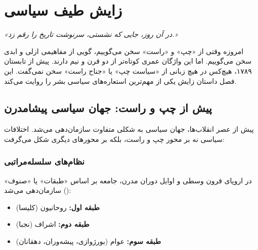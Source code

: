 
\chapter{زایش طیف سیاسی}
\label{ch:birth-of-spectrum}

\begin{flushright}
\textit{«در آن روز، جایی که نشستی، سرنوشت تاریخ را رقم زد.»}
\end{flushright}


\lettrine[lines=3, lraise=0.1, nindent=0.5em]{\textcolor{LeftRed}{ا}}{مروزه} 
وقتی از «چپ» و «راست» سخن می‌گوییم، گویی از مفاهیمی ازلی و ابدی سخن می‌گوییم. اما این واژگان عمری کوتاه‌تر از دو قرن و نیم دارند. پیش از تابستان ۱۷۸۹، هیچ‌کس در هیچ زبانی از «سیاست چپ» یا «جناح راست» سخن نمی‌گفت. این فصل داستان زایش یکی از مهم‌ترین استعاره‌های سیاسی بشر را روایت می‌کند.

\section{پیش از چپ و راست: جهان سیاسی پیشامدرن}

پیش از عصر انقلاب‌ها، جهان سیاسی به شکلی متفاوت سازمان‌دهی می‌شد. اختلافات سیاسی نه بر محور چپ و راست، بلکه بر محورهای دیگری شکل می‌گرفت:

\subsection{نظام‌های سلسله‌مراتبی}

در اروپای قرون وسطی و اوایل دوران مدرن، جامعه بر اساس «طبقات» یا «صنوف» () سازمان‌دهی می‌شد:

\begin{itemize}[nosep, rightmargin=1.5cm]
    \item \textbf{طبقه اول:} روحانیون (کلیسا)
    \item \textbf{طبقه دوم:} اشراف (نجبا)
    \item \textbf{طبقه سوم:} عوام (بورژوازی، پیشه‌وران، دهقانان)
\end{itemize}

